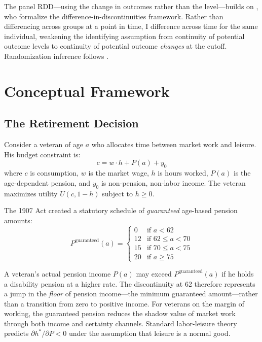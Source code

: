 \documentclass[12pt]{article}
\begin{document}
The panel RDD---using the change in outcomes rather than the level---builds on \citet{grembi2016fiscal}, who formalize the difference-in-discontinuities framework. Rather than differencing across groups at a point in time, I difference across time for the same individual, weakening the identifying assumption from continuity of potential outcome levels to continuity of potential outcome \textit{changes} at the cutoff. Randomization inference follows \citet{CattaneoFrandsenTitiunik2015}.


\section{Conceptual Framework}

\subsection{The Retirement Decision}

Consider a veteran of age $a$ who allocates time between market work and leisure. His budget constraint is:
\begin{equation}
c = w \cdot h + P(a) + y_0
\end{equation}
where $c$ is consumption, $w$ is the market wage, $h$ is hours worked, $P(a)$ is the age-dependent pension, and $y_0$ is non-pension, non-labor income. The veteran maximizes utility $U(c, 1-h)$ subject to $h \geq 0$.

The 1907 Act created a statutory schedule of \textit{guaranteed} age-based pension amounts:
\begin{equation}
P^{\text{guaranteed}}(a) = \begin{cases}
0 & \text{if } a < 62 \\
12 & \text{if } 62 \leq a < 70 \\
15 & \text{if } 70 \leq a < 75 \\
20 & \text{if } a \geq 75
\end{cases}
\end{equation}

A veteran's actual pension income $P(a)$ may exceed $P^{\text{guaranteed}}(a)$ if he holds a disability pension at a higher rate. The discontinuity at 62 therefore represents a jump in the \textit{floor} of pension income---the minimum guaranteed amount---rather than a transition from zero to positive income. For veterans on the margin of working, the guaranteed pension reduces the shadow value of market work through both income and certainty channels. Standard labor-leisure theory predicts $\partial h^* / \partial P < 0$ under the assumption that leisure is a normal good.
\end{document}
